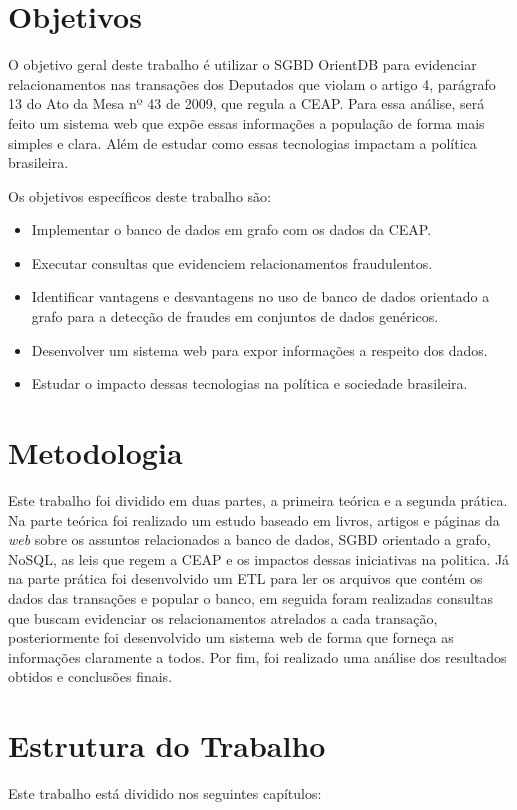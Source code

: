 \section{Objetivos}
	O objetivo geral deste trabalho é utilizar o SGBD OrientDB para evidenciar relacionamentos nas transações dos Deputados que violam o artigo 4, parágrafo 13 do Ato da Mesa nº 43 de 2009, que regula a CEAP. Para essa análise, será feito um sistema web que expõe essas informações a população de forma mais simples e clara. Além de estudar como essas tecnologias impactam a política brasileira.
	
	Os objetivos específicos deste trabalho são:
	\begin{itemize}
		\item Implementar o banco de dados em grafo com os dados da CEAP.
		\item Executar consultas que evidenciem relacionamentos fraudulentos.
		\item Identificar vantagens e desvantagens no uso de banco de dados orientado a grafo para a detecção de fraudes em conjuntos de dados genéricos.
		\item Desenvolver um sistema web para expor informações a respeito dos dados.
		\item Estudar o impacto dessas tecnologias na política e sociedade brasileira.
	\end{itemize}

\section{Metodologia}

	Este trabalho foi dividido em duas partes, a primeira teórica e a segunda prática. Na parte teórica foi realizado um estudo baseado em livros, artigos e páginas da \textit{web} sobre os assuntos relacionados a banco de dados, SGBD orientado a grafo, NoSQL, as leis que regem a CEAP e os impactos dessas iniciativas na politica. Já na parte prática foi desenvolvido um ETL para ler os arquivos que contém os dados das transações e popular o banco, em seguida foram realizadas consultas que buscam evidenciar os relacionamentos atrelados a cada transação, posteriormente foi desenvolvido um sistema web de forma que forneça as informações claramente a todos. Por fim, foi realizado uma análise dos resultados obtidos e conclusões finais.

\section{Estrutura do Trabalho}
	Este trabalho está dividido nos seguintes capítulos:
	
